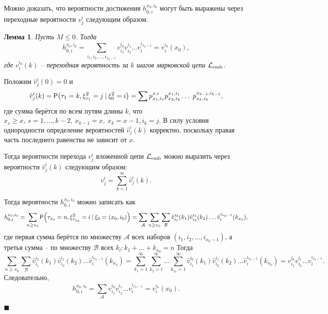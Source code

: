 \documentclass{article}
\newtheorem{Lem}{Лемма}[section]
\newcommand{\anyletter}[3]{#1^{#2}_{#3}}
\newcommand{\PP}{\mathsf{P}}
\newcommand{\LEMB}{\mathcal{L}_{\textup{emb}}}
\let\originalleft\left
\let\originalright\right
\renewcommand{\left}{\mathopen{}\mathclose\bgroup\originalleft}
\renewcommand{\right}{\aftergroup\egroup\originalright}
\newcommand{\brackets}[1]{\left(#1 \right)}
\newenvironment{Proof}
{\par\noindent{\bf Доказательство}}
{\hfill$\scriptstyle\blacksquare$}
\begin{document}
\noindent Можно доказать, что вероятности достижения $\anyletter{h}{x_0, i_0}{0,i}$ могут быть выражены через переходные вероятности $\anyletter{v}{i}{j}$ следующим образом.
\begin{Lem}\label{lem:h_and_v_connection}
Пусть $M \leq 0$. Тогда
\[
\anyletter{h}{x_0, i_0}{0,i} = \sum_{i_1, i_2, \dots, i_{x_0 - 1}} \anyletter{v}{i_0}{i_1} \anyletter{v}{i_1}{i_2} \dots \anyletter{v}{i_{x_0-1}}{i} = \anyletter{v}{i_0}{i}(x_0),
\]
где $\anyletter{v}{i_0}{i}(k)$ -- переходная вероятность за $k$ шагов марковской цепи $\LEMB$.
\end{Lem}
\begin{Proof}
Положим $\anyletter{\hat{v}}{i}{j}(0) = 0$ и
\[
\anyletter{\hat{v}}{i}{j}(k) = \PP\brackets{\tau_1 = k, \xi_{\tau_1}^{2} = j \: | \: \xi_{0}^{2} = i} = \sum \anyletter{p}{x, i}{x_1, i_1}  \anyletter{p}{x_1, i_1}{x_2, i_2} \dots \ \anyletter{p}{x_{k - 1}, i_{k - 1}}{x_k, i_k}, 
\]
где сумма берётся по всем путям длины $k$, что $x_s \geq x, \: s = 1, \dots, k - 2, \: x_{k-1} = x, \: x_k = x - 1,  i_k = j$.  В силу условия однородности определение вероятностей $\anyletter{\hat{v}}{i}{j}(k)$ корректно, поскольку правая часть последнего равенства не зависит от $x$.

\noindent Тогда вероятности перехода $\anyletter{v}{i}{j}$ вложенной цепи $\LEMB$ можно выразить через вероятности $\anyletter{\hat{v}}{i}{j}(k)$ следующим образом:
\[
\anyletter{v}{i}{j} = \sum_{k = 1}^{\infty} \anyletter{\hat{v}}{i}{j}(k).
\]

\noindent Тогда вероятности $\anyletter{h}{x_0, i_0}{0,i}$ можно записать как
\[
\anyletter{h}{x_0, i_0}{0,i} = \sum_{n \geq x_0}\PP \brackets{\tau_{x_0} = n,  \xi_{\tau_{x_0}}^{2} = i \: | \:  \xi_{0} = (x_0, i_0)} = \sum_{\mathcal{A}} \sum_{n \geq x_0} \sum_{\mathcal{B}} \anyletter{\hat{v}}{i_0}{i_1}(k_1) \anyletter{\hat{v}}{i_1}{i_2}(k_2)\dots \anyletter{\hat{v}}{i_{x_0 -1}}{i}(k_{x_0}),
\]
где первая сумма берётся по множеству $\mathcal{A}$ всех наборов $(i_1, i_2, \dots, i_{x_0 - 1})$, а третья сумма -- по множеству $\mathcal{B}$ всех $k_l :  k_1 + \dots + k_{x_0} = n$
Тогда 
\[
\sum_{n \geq x_0} \sum_{\mathcal{B}} \anyletter{\hat{v}}{i_0}{i_1}(k_1) \anyletter{\hat{v}}{i_1}{i_2}(k_2)\dots \anyletter{\hat{v}}{i_{x_0 -1}}{i}(k_{x_0}) = \sum_{k_1 = 1}^{\infty}\sum_{k_2 = 1}^{\infty} \dots \sum_{k_{x_0} = 1}^{\infty} \anyletter{\hat{v}}{i_0}{i_1}(k_1)\anyletter{\hat{v}}{i_1}{i_2}(k_2)\dots \anyletter{\hat{v}}{i_{x_0 -1}}{i}(k_{x_0}) = \anyletter{v}{i_0}{i_1} \anyletter{v}{i_1}{i_2}\dots \anyletter{v}{i_{x_0 - 1}}{i}.
\]
Следовательно,
\[
\anyletter{h}{x_0, i_0}{0,i} = \sum_{\mathcal{A}} \anyletter{v}{i_0}{i_1} \anyletter{v}{i_1}{i_2}\dots \anyletter{v}{i_{x_0 - 1}}{i} = \anyletter{v}{i_0}{i}(x_0).
\]

\end{Proof}
\end{document}
